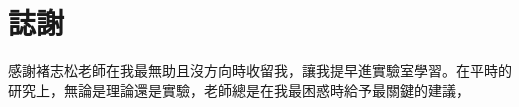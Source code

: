 \documentclass[class=NCU_thesis, crop=false]{standalone}
\begin{document}
\chapter{誌謝}

感謝褚志松老師在我最無助且沒方向時收留我，讓我提早進實驗室學習。在平時的研究上，無論是理論還是實驗，老師總是在我最困惑時給予最關鍵的建議，
\end{document}
